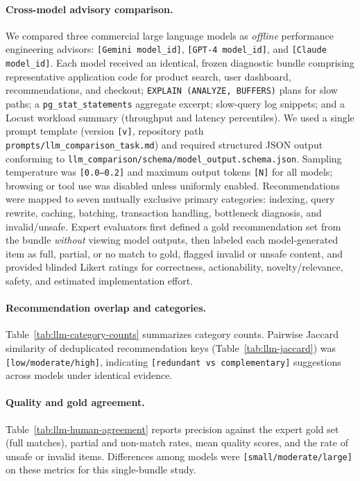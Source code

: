 
\paragraph{Cross-model advisory comparison.}
We compared three commercial large language models as \emph{offline} performance engineering advisors: \texttt{[Gemini model\_id]}, \texttt{[GPT-4 model\_id]}, and \texttt{[Claude model\_id]}.
Each model received an identical, frozen diagnostic bundle comprising representative application code for product search, user dashboard, recommendations, and checkout; \texttt{EXPLAIN (ANALYZE, BUFFERS)} plans for slow paths; a \texttt{pg\_stat\_statements} aggregate excerpt; slow-query log snippets; and a Locust workload summary (throughput and latency percentiles).
We used a single prompt template (version \texttt{[v]}, repository path \texttt{prompts/llm\_comparison\_task.md}) and required structured JSON output conforming to \texttt{llm\_comparison/schema/model\_output.schema.json}.
Sampling temperature was \texttt{[0.0--0.2]} and maximum output tokens \texttt{[N]} for all models; browsing or tool use was disabled unless uniformly enabled.
Recommendations were mapped to seven mutually exclusive primary categories: indexing, query rewrite, caching, batching, transaction handling, bottleneck diagnosis, and invalid/unsafe.
Expert evaluators first defined a gold recommendation set from the bundle \emph{without} viewing model outputs, then labeled each model-generated item as full, partial, or no match to gold, flagged invalid or unsafe content, and provided blinded Likert ratings for correctness, actionability, novelty/relevance, safety, and estimated implementation effort.

\paragraph{Recommendation overlap and categories.}
Table~\ref{tab:llm-category-counts} summarizes category counts.
Pairwise Jaccard similarity of deduplicated recommendation keys (Table~\ref{tab:llm-jaccard}) was \texttt{[low/moderate/high]}, indicating \texttt{[redundant vs complementary]} suggestions across models under identical evidence.

\paragraph{Quality and gold agreement.}
Table~\ref{tab:llm-human-agreement} reports precision against the expert gold set (full matches), partial and non-match rates, mean quality scores, and the rate of unsafe or invalid items.
Differences among models were \texttt{[small/moderate/large]} on these metrics for this single-bundle study.

